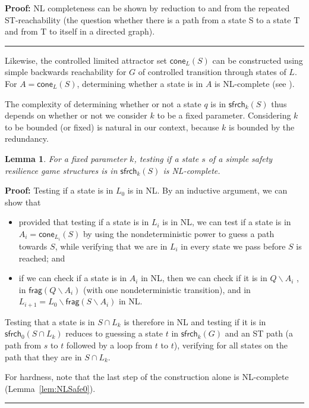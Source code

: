 \documentclass[times,10pt,twocolumn]{article}
\newtheorem{lemma}[theorem]{Lemma}
\newenvironment{proof}{\noindent\par{\bf Proof: }}{\nopagebreak\rule{1 ex}{0.8 em}\medskip}
\newcommand\cla{\mathsf{cone}}
\newcommand\frag{\mathsf{frag}}
\newcommand\safe{\mathsf{sfrch}}
\begin{document}
\begin{proof}
NL completeness can be shown by reduction to and from the repeated ST-reachability \cite{Papadimitriou94} (the question whether there is a path from a state S to a state T and from T to itself in a directed graph).
\end{proof}

Likewise, the controlled limited attractor set 
$\cla_L(S)$ can be constructed using simple backwards reachability 
for $G$ of controlled transition through states of $L$.
For 
$A = \cla_L(S)$, determining whether a state is in $A$ 
is NL-complete (see \cite{Papadimitriou94}).

The complexity of determining whether or not a state $q$ is 
in $\safe_k(S)$ thus depends on whether or not we consider $k$ 
to be a fixed parameter.
Considering $k$ to be bounded (or fixed) is natural in our context, 
because $k$ is bounded by the redundancy.

\begin{lemma}
\label{lem:NLSafek}
For a fixed parameter $k$, testing if a state $s$ of a simple safety resilience game structures
 is in $\safe_k(S)$ is NL-complete.
\end{lemma}

\begin{proof}
Testing if a state is in $L_0$ is in NL.
%
By an inductive argument, we can show that
\begin{itemize}
\item provided that testing if a state is in $L_i$ is in NL,
we can test if a state is in $A_i = \cla_{L_i}(S)$ by using the nondeterministic power to guess a path towards $S$, while verifying that we are in $L_i$ in every state we pass before $S$ is reached; and
\item if we can check if a state is in $A_i$ in NL, then we can check if it is in $Q\smallsetminus A_i$ \cite{Immerman88}, in $\frag(Q\smallsetminus A_i)$ (with one nondeterministic transition), and in $L_{i+1}=L_0 \smallsetminus \frag(S\smallsetminus A_i)$ \cite{Immerman88} in NL.
\end{itemize}

Testing that a state is in $S \cap L_k$ is therefore in NL and testing if it is in $\safe_0(S \cap L_k)$ reduces to guessing a state $t$ in $\safe_k(G)$ and an ST path (a path from $s$ to $t$ followed by a loop from $t$ to $t$), verifying for all states on the path that they are in $S \cap L_k$.

For hardness, note that the last step of the construction alone is NL-complete (Lemma~\ref{lem:NLSafe0}).
\end{proof}
\end{document}
